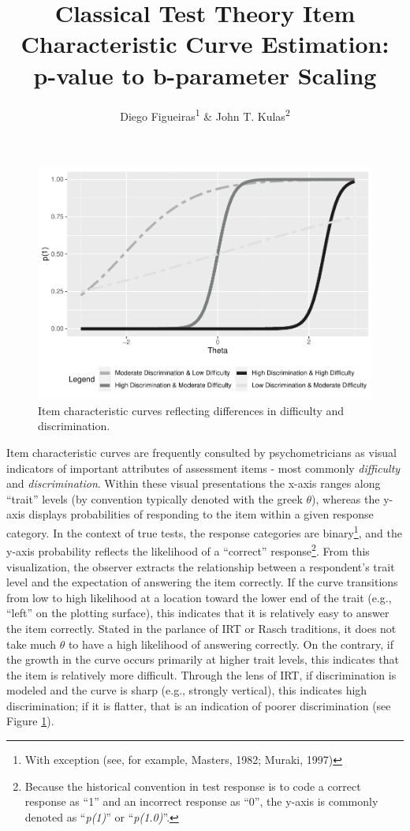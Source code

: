 \documentclass[
  man]{apa6}
\title{Classical Test Theory Item Characteristic Curve Estimation: p-value to b-parameter Scaling}
\author{Diego Figueiras\textsuperscript{1} \& John T. Kulas\textsuperscript{2}}
\date{}
\affiliation{\vspace{0.5cm}\textsuperscript{1} Montclair State University\\\textsuperscript{2} eRg}
\begin{document}
\maketitle

\begin{figure}
\includegraphics[width=1\linewidth,height=0.8\textheight]{SIOP_files/figure-latex/example-1} \caption{Item characteristic curves reflecting differences in difficulty and discrimination.}\label{fig:example}
\end{figure}

Item characteristic curves are frequently consulted by psychometricians as visual indicators of important attributes of assessment items - most commonly \emph{difficulty} and \emph{discrimination}. Within these visual presentations the x-axis ranges along ``trait'' levels (by convention typically denoted with the greek \(\theta\)), whereas the y-axis displays probabilities of responding to the item within a given response category. In the context of true tests, the response categories are binary\footnote{With exception (see, for example, Masters, 1982; Muraki, 1997)}, and the y-axis probability reflects the likelihood of a ``correct'' response\footnote{Because the historical convention in test response is to code a correct response as ``1'' and an incorrect response as ``0'', the y-axis is commonly denoted as ``\emph{p(1)}'' or ``\emph{p(1.0)}''.}. From this visualization, the observer extracts the relationship between a respondent's trait level and the expectation of answering the item correctly. If the curve transitions from low to high likelihood at a location toward the lower end of the trait (e.g., ``left'' on the plotting surface), this indicates that it is relatively easy to answer the item correctly. Stated in the parlance of IRT or Rasch traditions, it does not take much \(\theta\) to have a high likelihood of answering correctly. On the contrary, if the growth in the curve occurs primarily at higher trait levels, this indicates that the item is relatively more difficult. Through the lens of IRT, if discrimination is modeled and the curve is sharp (e.g., strongly vertical), this indicates high discrimination; if it is flatter, that is an indication of poorer discrimination (see Figure \ref{fig:example}).
\end{document}
